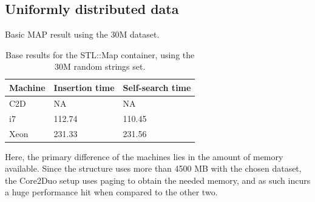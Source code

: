 \subsection{Uniformly distributed data}
Basic MAP result using the 30M dataset.

\begin{table}[h!]
    \centering
    \begin{tabular}[here]{ l l l }
        \hline
        Machine   & Insertion time & Self-search time  \\\hline
        C2D       & NA             & NA                \\\hline
        i7        & 112.74         & 110.45            \\\hline
        Xeon      & 231.33         & 231.56            \\\hline 
    \end{tabular}
    \caption{Base results for the STL::Map container, using the 30M random strings set.}
    \label{tab:maptimes}
\end{table}

Here, the primary difference of the machines lies in the amount of memory
available. Since the structure uses more than 4500 MB with the chosen dataset,
the Core2Duo setup uses paging to obtain the needed memory, and as such incurs
a huge performance hit when compared to the other two.


